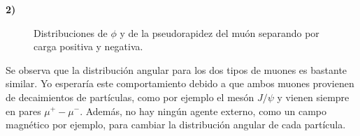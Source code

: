 \documentclass[11pt]{article}
\begin{document}
\textbf{2)}
\begin{figure}[H]
\centering
{}

\caption{Distribuciones de $\phi$ y de la pseudorapidez del muón separando por carga positiva y negativa.}
\label{fig:Prob2}
\end{figure}
Se observa que la distribución angular para los dos tipos de muones es bastante similar. Yo esperaría este comportamiento debido a que ambos muones provienen de decaimientos de partículas, como por ejemplo el mesón $J/\psi$ y vienen siempre en pares $\mu^+ - \mu^-$. Además, no hay ningún agente externo, como un campo magnético por ejemplo, para cambiar la distribución angular de cada partícula.
\pagebreak
\end{document}

